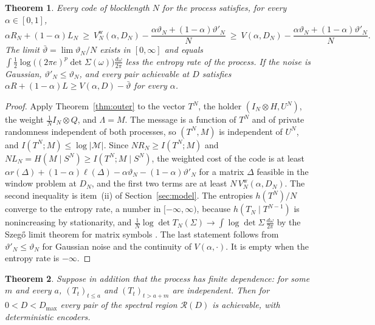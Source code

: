\documentclass[11pt,onecolumn]{IEEEtran}
\newtheorem{theorem}{Theorem}
\newcommand{\dw}{\tfrac{d\omega}{2\pi}}
\begin{document}
\begin{theorem}\label{thm:procouter}
Every code of blocklength $N$ for the process satisfies, for every
$\alpha\in[0,1]$,
\[
\alpha R_N+(1-\alpha)L_N\ \ge\ V^{\mathrm w}_N(\alpha,D_N)-\frac{\alpha\vartheta_N+(1-\alpha)\vartheta'_N}{N}
\ \ge\ V(\alpha,D_N)-\frac{\alpha\vartheta_N+(1-\alpha)\vartheta'_N}{N}.
\]
The limit $\bar\vartheta=\lim\vartheta_N/N$ exists in $[0,\infty]$ and
equals
$\int\tfrac12\log\bigl((2\pi e)^p\det\Sigma(\omega)\bigr)\dw$ less the
entropy rate of the process. If the noise is Gaussian,
$\vartheta'_N\le\vartheta_N$, and every pair achievable at $D$
satisfies $\alpha R+(1-\alpha)L\ge V(\alpha,D)-\bar\vartheta$ for every
$\alpha$.
\end{theorem}

\begin{proof}
Apply Theorem~\ref{thm:outer} to the vector $T^N$, the holder
$(I_N\otimes H,U^N)$, the weight $\tfrac1NI_N\otimes Q$, and
$\Lambda=M$. The message is a function of $T^N$ and of private
randomness independent of both processes, so $(T^N,M)$ is independent
of $U^N$, and $I(T^N;M)\le\log|\mathcal M|$. Since
$NR_N\ge I(T^N;M)$ and $NL_N=H(M\mid S^N)\ge I(T^N;M\mid S^N)$, the
weighted cost of the code is at least
$\alpha r(\Delta)+(1-\alpha)\ell(\Delta)-\alpha\vartheta_N-(1-\alpha)\vartheta'_N$
for a matrix $\Delta$ feasible in the window problem at $D_N$, and the
first two terms are at least $N\,V^{\mathrm w}_N(\alpha,D_N)$. The second
inequality is item~(ii) of Section~\ref{sec:model}. The entropies
$h(T^N)/N$ converge to the entropy rate, a number in $[-\infty,\infty)$,
because $h(T_N\mid T^{N-1})$ is nonincreasing by stationarity, and
$\tfrac1N\log\det T_N(\Sigma)\to\int\log\det\Sigma\,\dw$ by the Szeg\H{o}
limit theorem for matrix symbols \cite[Lemma~14]{part2}. The last
statement follows from $\vartheta'_N\le\vartheta_N$ for Gaussian noise
and the continuity of $V(\alpha,\cdot)$. It is empty when the entropy
rate is $-\infty$.
\end{proof}

\begin{theorem}\label{thm:procinner}
Suppose in addition that the process has finite dependence: for some
$m$ and every $a$, $(T_t)_{t\le a}$ and $(T_t)_{t>a+m}$ are independent.
Then for $0<D<D_{\max}$ every pair of the spectral region
$\mathcal R(D)$ is achievable, with deterministic encoders.
\end{theorem}
\end{document}
